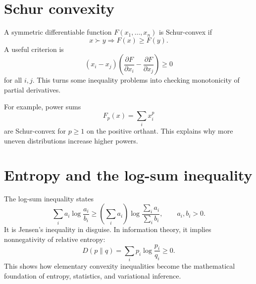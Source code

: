\section{Schur convexity}

A symmetric differentiable function $F(x_1,\ldots,x_n)$ is Schur-convex if
\[
  x\succ y\Rightarrow F(x)\ge F(y).
\]
A useful criterion is
\[
  (x_i-x_j)\left(\frac{\partial F}{\partial x_i}-\frac{\partial F}{\partial x_j}\right)\ge0
\]
for all $i,j$.  This turns some inequality problems into checking monotonicity of partial derivatives.

For example, power sums
\[
  F_p(x)=\sum_i x_i^p
\]
are Schur-convex for $p\ge1$ on the positive orthant.  This explains why more uneven distributions increase higher powers.

\section{Entropy and the log-sum inequality}

The log-sum inequality states
\[
  \sum_i a_i\log\frac{a_i}{b_i}
  \ge
  \left(\sum_i a_i\right)\log\frac{\sum_i a_i}{\sum_i b_i},\qquad a_i,b_i>0.
\]
It is Jensen's inequality in disguise.  In information theory, it implies nonnegativity of relative entropy:
\[
  D(p\|q)=\sum_i p_i\log\frac{p_i}{q_i}\ge0.
\]
This shows how elementary convexity inequalities become the mathematical foundation of entropy, statistics, and variational inference.
